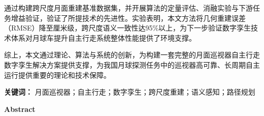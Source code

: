 通过构建跨尺度月面重建基准数据集，并开展算法的定量评估、消融实验与下游任务增益验证，验证了所提技术的先进性。实验表明，本文方法将几何重建误差（RMSE）降至厘米级，跨尺度语义一致性达95\%以上，为下一步验证数字孪生技术体系对月球车提升自主行走系统整体性能提供了环境支撑。

综上，本文通过理论、算法与系统的创新，为构建一套完整的月面巡视器自主行走数字孪生解决方案提供支撑，为我国月球探测任务中的巡视器高可靠、长周期自主运行提供重要的理论和技术保障。

\vspace{0.5\baselineskip}

\noindent\heiti{}\textbf{关键词：}\songti{} 月面巡视器；自主行走；数字孪生；跨尺度重建；语义感知；路径规划

\thispagestyle{frontpage}

\newpage
\thispagestyle{frontpage}

\thispagestyle{frontpage}

\newpage
\thispagestyle{frontpage}

\label{chapter:abstract-en}


\begin{center}
\arial\bfseries{} Abstract
\end{center}

\vspace{0.5\baselineskip}

\rmfamily{}
\linespread{1.5}\selectfont
\setlength{\parindent}{2em}

